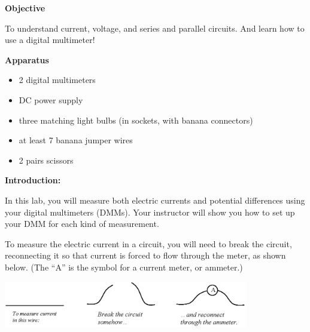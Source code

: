 \makelabheader %

\textbf{Objective}

To understand current, voltage, and series and parallel circuits.  And learn how to use a digital multimeter!

\textbf{Apparatus}

\begin{itemize} \itemsep1pt
\item 2 digital multimeters 
\item DC power supply 
\item three matching light bulbs (in sockets, with banana connectors)
\item at least 7 banana jumper wires 
\item 2 pairs scissors
\end{itemize}

\textbf{Introduction:}

In this lab, you will measure both electric currents and potential differences using your digital multimeters (DMMs).  Your instructor will show you how to set up your DMM for each kind of measurement.

To measure the electric current in a circuit, you will need to break the circuit, reconnecting it so that current is forced to flow through the meter, as shown below.  (The ``A'' is the symbol for a current meter, or ammeter.)

\begin{center}
\includegraphics[width=0.8\textwidth]{electric_circuits/how_to_measure_current.eps}
\end{center}
\vspace{-0.1in}

